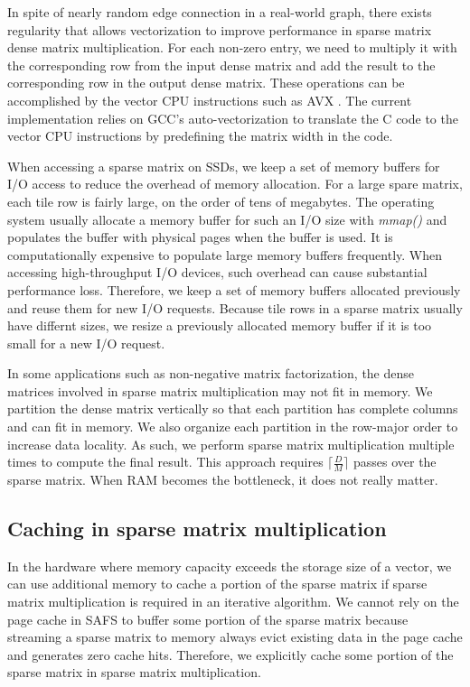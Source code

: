 In spite of nearly random edge connection in a real-world graph,
there exists regularity that allows vectorization to improve performance
in sparse matrix dense matrix multiplication. For each non-zero entry, we
need to multiply it with the corresponding row from the input dense matrix
and add the result to the corresponding row in the output dense matrix.
These operations can be accomplished by the vector CPU instructions such as
AVX \cite{avx}. The current implementation relies on GCC's auto-vectorization
to translate the C code to the vector CPU instructions by predefining the matrix
width in the code.

When accessing a sparse matrix on SSDs, we keep a set of memory buffers for
I/O access to reduce the overhead of memory allocation.
For a large spare matrix, each tile row is fairly large, on the order
of tens of megabytes. The operating system usually allocate a memory buffer
for such an I/O size with \textit{mmap()} and populates the buffer with physical
pages when the buffer is used. It is computationally expensive to populate
large memory buffers frequently. When accessing high-throughput I/O devices,
such overhead can cause substantial performance loss. Therefore, we keep a set
of memory buffers allocated previously and reuse them for new I/O requests.
Because tile rows in a sparse matrix usually have differnt sizes, we resize
a previously allocated memory buffer if it is too small for a new I/O request.

In some applications such as non-negative matrix factorization, the dense matrices
involved in sparse matrix multiplication may not fit in memory. We partition
the dense matrix vertically so that each partition has complete columns and can
fit in memory. We also organize each partition in the row-major order to increase
data locality. As such, we perform sparse matrix multiplication multiple times
to compute the final result. This approach requires $\lceil \frac{D}{M} \rceil$
passes over the sparse matrix. When RAM becomes the bottleneck, it does not
really matter.

\subsection{Caching in sparse matrix multiplication}
In the hardware where memory capacity exceeds the storage size of a vector, we
can use additional memory to cache a portion of the sparse matrix if sparse matrix
multiplication is required in an iterative algorithm. We cannot rely on
the page cache in SAFS \cite{sa-cache} to buffer some portion of the sparse matrix
because streaming a sparse matrix to memory always evict existing data in the page
cache and generates zero cache hits. Therefore, we explicitly cache some portion
of the sparse matrix in sparse matrix multiplication.

